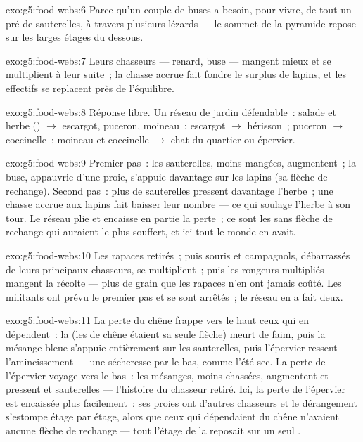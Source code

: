 \begin{solution}{exo:g5:food-webs:6}
Parce qu'un couple de buses a besoin, pour vivre, de tout un pré de
sauterelles, à travers plusieurs lézards --- le sommet de la
pyramide repose sur les larges étages du dessous.
\end{solution}

\begin{solution}{exo:g5:food-webs:7}
Leurs chasseurs --- renard, buse --- mangent mieux et se multiplient
à leur suite~; la chasse accrue fait fondre le surplus de lapins, et
les effectifs se replacent près de l'équilibre.
\end{solution}

\begin{solution}{exo:g5:food-webs:8}
Réponse libre. Un réseau de jardin défendable~: salade et herbe
() $\rightarrow$ escargot, puceron, moineau~; escargot
$\rightarrow$ hérisson~; puceron $\rightarrow$ coccinelle~; moineau
et coccinelle $\rightarrow$ chat du quartier ou épervier.
\end{solution}

\begin{solution}{exo:g5:food-webs:9}
Premier pas~: les sauterelles, moins mangées, augmentent~; la buse,
appauvrie d'une proie, s'appuie davantage sur les lapins (sa flèche
de rechange). Second pas~: plus de sauterelles pressent davantage
l'herbe~; une chasse accrue aux lapins fait baisser leur nombre ---
ce qui soulage l'herbe à son tour. Le réseau plie et encaisse en
partie la perte~; ce sont les  sans flèche de rechange qui
auraient le plus souffert, et ici tout le monde en avait.
\end{solution}

\begin{solution}{exo:g5:food-webs:10}
Les rapaces retirés~; puis souris et campagnols, débarrassés de
leurs principaux chasseurs, se multiplient~; puis les rongeurs
multipliés mangent la récolte --- plus de grain que les rapaces
n'en ont jamais coûté. Les militants ont prévu le premier pas et se
sont arrêtés~; le réseau en a fait deux.
\end{solution}

\begin{solution}{exo:g5:food-webs:11}
La perte du chêne frappe vers le haut ceux qui en dépendent~: la
 (les  de chêne étaient sa seule flèche) meurt de
faim, puis la mésange bleue s'appuie entièrement sur les
sauterelles, puis l'épervier ressent l'amincissement --- une
sécheresse par le bas, comme l'été sec. La perte de l'épervier
voyage vers le bas~: les mésanges, moins chassées, augmentent et
pressent  et sauterelles --- l'histoire du chasseur retiré.
Ici, la perte de l'épervier est encaissée plus facilement~: ses
proies ont d'autres chasseurs et le dérangement s'estompe étage par
étage, alors que ceux qui dépendaient du chêne n'avaient aucune
flèche de rechange --- tout l'étage de la  reposait sur un
seul .
\end{solution}
